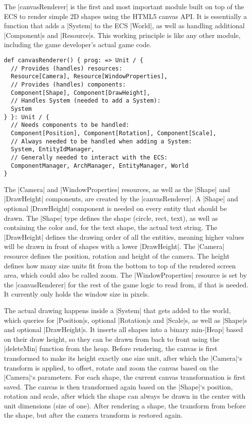 The |canvasRenderer| is the first and most important module built on top of the ECS to render simple 2D shapes using the HTML5 canvas API. It is essentially a function that adds a |System| to the ECS |World|, as well as handling additional |Component|s and |Resource|s. This working principle is like any other module, including the game developer's actual game code.

\begin{lstlisting}[caption=canvasRenderer signature]
def canvasRenderer() { prog: => Unit / {
  // Provides (handles) resources:
  Resource[Camera], Resource[WindowProperties],
  // Provides (handles) components:
  Component[Shape], Component[DrawHeight],
  // Handles System (needed to add a System):
  System
} }: Unit / {
  // Needs components to be handled:
  Component[Position], Component[Rotation], Component[Scale],
  // Always needed to be handled when adding a System:
  System, EntityIdManager,
  // Generally needed to interact with the ECS:
  ComponentManager, ArchManager, EntityManager, World
}
\end{lstlisting}

The |Camera| and |WindowProperties| resources, as well as the |Shape| and |DrawHeight| components, are created by the |canvasRenderer|. A |Shape| and optional |DrawHeight| component is needed on every entity that should be drawn. The |Shape| type defines the shape (circle, rect, text), as well as containing the color and, for the text shape, the actual text string. The |DrawHeight| defines the drawing order of all the entities, meaning higher values will be drawn in front of shapes with a lower |DrawHeight|. The |Camera| resource defines the position, rotation and height of the camera. The height defines how many size units fit from the bottom to top of the rendered screen area, which could also be called zoom. The |WindowProperties| resource is set by the |canvasRenderer| for the rest of the game logic to read from, if that is needed. It currently only holds the window size in pixels.

The actual drawing happens inside a |System| that gets added to the world, which queries for |Position|s, optional |Rotation|s and |Scale|s, as well as |Shape|s and optional |DrawHeight|s. It inserts all shapes into a binary min-|Heap| based on their draw height, so they can be drawn from back to front using the |deleteMin| function from the heap. Before rendering, the canvas is first transformed to make its height exactly one size unit, after which the |Camera|`s transform is applied, to offset, rotate and zoom the canvas based on the |Camera|`s parameters. For each shape, the current canvas transformation is first saved. The canvas is then transformed again based on the |Shape|`s position, rotation and scale, after which the shape can always be drawn in the center with unit dimensions (size of one). After rendering a shape, the transform from before the shape, but after the camera transform is restored again.

